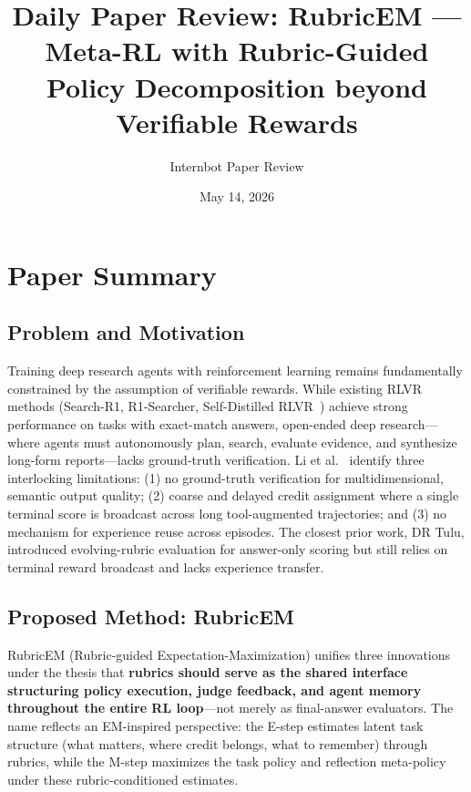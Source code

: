 \documentclass[11pt,a4paper]{article}
\title{Daily Paper Review: RubricEM --- Meta-RL with Rubric-Guided Policy Decomposition beyond Verifiable Rewards}
\author{Internbot Paper Review}
\date{May 14, 2026}
\begin{document}
\maketitle

\section{Paper Summary}

\subsection{Problem and Motivation}

Training deep research agents with reinforcement learning remains fundamentally constrained by the assumption of verifiable rewards. While existing RLVR methods (Search-R1, R1-Searcher, Self-Distilled RLVR~\cite{selfdistilledrlvr}) achieve strong performance on tasks with exact-match answers, open-ended deep research---where agents must autonomously plan, search, evaluate evidence, and synthesize long-form reports---lacks ground-truth verification. Li et al.~\cite{rubricem} identify three interlocking limitations: (1) no ground-truth verification for multidimensional, semantic output quality; (2) coarse and delayed credit assignment where a single terminal score is broadcast across long tool-augmented trajectories; and (3) no mechanism for experience reuse across episodes. The closest prior work, DR Tulu, introduced evolving-rubric evaluation for answer-only scoring but still relies on terminal reward broadcast and lacks experience transfer.

\subsection{Proposed Method: RubricEM}

RubricEM (Rubric-guided Expectation-Maximization) unifies three innovations under the thesis that \textbf{rubrics should serve as the shared interface structuring policy execution, judge feedback, and agent memory throughout the entire RL loop}---not merely as final-answer evaluators. The name reflects an EM-inspired perspective: the E-step estimates latent task structure (what matters, where credit belongs, what to remember) through rubrics, while the M-step maximizes the task policy and reflection meta-policy under these rubric-conditioned estimates.
\end{document}
